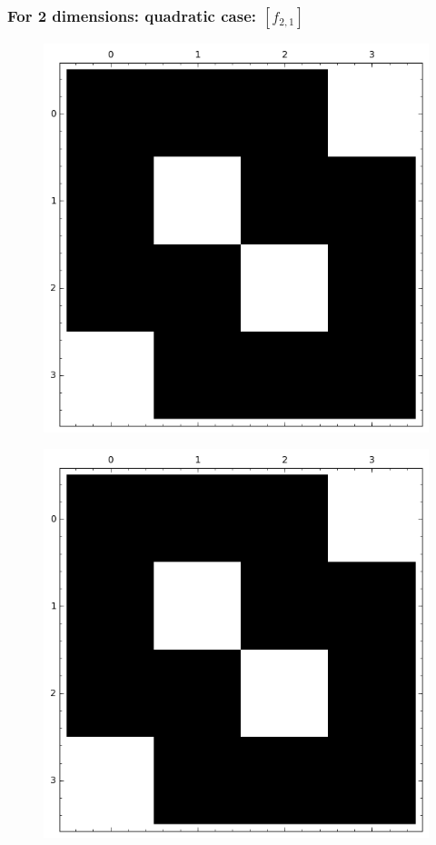 \documentclass[pdf,sprung,slideColor,nocolorBG]{beamer}
\newenvironment{colortheme}[1]{
\def\ProvidesPackageRCS $##1${\relax}
\renewcommand{\ProcessOptions}{\relax}
\makeatletter

\makeatother
}{}
\begin{document}
\begin{colortheme}{jubata}

\begin{frame}
\frametitle{For 2 dimensions: quadratic case: $[f_{2,1}]$}
\begin{figure}
\centering
\begin{minipage}{.48\textwidth}
  \centering
  \includegraphics[width=.9\linewidth]{../matrix_plot/c2_1_weight_class_matrix.png}
  \label{fig:q2_1_weight_class_matrix}
\end{minipage}%
\begin{minipage}{.48\textwidth}
  \centering
  \includegraphics[width=.9\linewidth]{../matrix_plot/c2_1_bent_cayley_graph_index_matrix.png}

\end{minipage}
\end{figure}
\end{frame}
\end{colortheme}
\end{document}
